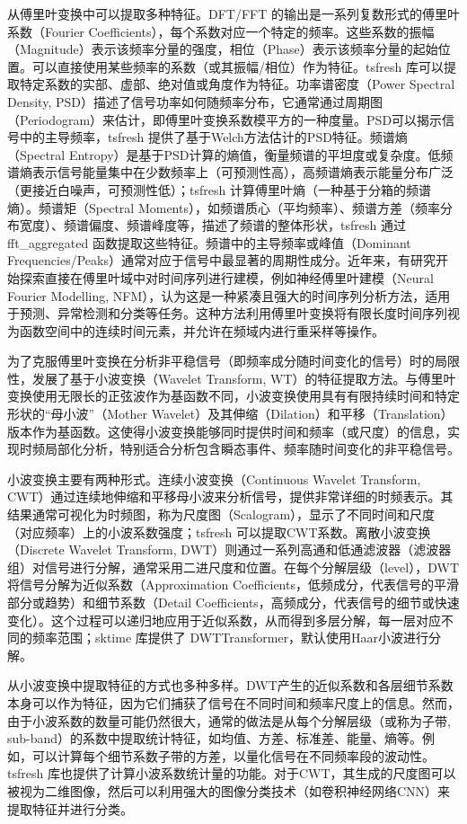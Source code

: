 从傅里叶变换中可以提取多种特征。DFT/FFT 的输出是一系列复数形式的傅里叶系数（Fourier Coefficients），每个系数对应一个特定的频率。这些系数的振幅（Magnitude）表示该频率分量的强度，相位（Phase）表示该频率分量的起始位置。可以直接使用某些频率的系数（或其振幅/相位）作为特征。tsfresh 库可以提取特定系数的实部、虚部、绝对值或角度作为特征。功率谱密度（Power Spectral Density, PSD）描述了信号功率如何随频率分布，它通常通过周期图（Periodogram）来估计，即傅里叶变换系数模平方的一种度量。PSD可以揭示信号中的主导频率，tsfresh 提供了基于Welch方法估计的PSD特征。频谱熵（Spectral Entropy）是基于PSD计算的熵值，衡量频谱的平坦度或复杂度。低频谱熵表示信号能量集中在少数频率上（可预测性高），高频谱熵表示能量分布广泛（更接近白噪声，可预测性低）；tsfresh 计算傅里叶熵（一种基于分箱的频谱熵）。频谱矩（Spectral Moments），如频谱质心（平均频率）、频谱方差（频率分布宽度）、频谱偏度、频谱峰度等，描述了频谱的整体形状，tsfresh 通过 fft\_aggregated 函数提取这些特征。频谱中的主导频率或峰值（Dominant Frequencies/Peaks）通常对应于信号中最显著的周期性成分。近年来，有研究开始探索直接在傅里叶域中对时间序列进行建模，例如神经傅里叶建模（Neural Fourier Modelling, NFM），认为这是一种紧凑且强大的时间序列分析方法，适用于预测、异常检测和分类等任务。这种方法利用傅里叶变换将有限长度时间序列视为函数空间中的连续时间元素，并允许在频域内进行重采样等操作。

为了克服傅里叶变换在分析非平稳信号（即频率成分随时间变化的信号）时的局限性，发展了基于小波变换（Wavelet Transform, WT）的特征提取方法。与傅里叶变换使用无限长的正弦波作为基函数不同，小波变换使用具有有限持续时间和特定形状的“母小波”（Mother Wavelet）及其伸缩（Dilation）和平移（Translation）版本作为基函数。这使得小波变换能够同时提供时间和频率（或尺度）的信息，实现时频局部化分析，特别适合分析包含瞬态事件、频率随时间变化的非平稳信号。

小波变换主要有两种形式。连续小波变换（Continuous Wavelet Transform, CWT）通过连续地伸缩和平移母小波来分析信号，提供非常详细的时频表示。其结果通常可视化为时频图，称为尺度图（Scalogram），显示了不同时间和尺度（对应频率）上的小波系数强度；tsfresh 可以提取CWT系数。离散小波变换（Discrete Wavelet Transform, DWT）则通过一系列高通和低通滤波器（滤波器组）对信号进行分解，通常采用二进尺度和位置。在每个分解层级（level），DWT将信号分解为近似系数（Approximation Coefficients，低频成分，代表信号的平滑部分或趋势）和细节系数（Detail Coefficients，高频成分，代表信号的细节或快速变化）。这个过程可以递归地应用于近似系数，从而得到多层分解，每一层对应不同的频率范围；sktime 库提供了 DWTTransformer，默认使用Haar小波进行分解。

从小波变换中提取特征的方式也多种多样。DWT产生的近似系数和各层细节系数本身可以作为特征，因为它们捕获了信号在不同时间和频率尺度上的信息。然而，由于小波系数的数量可能仍然很大，通常的做法是从每个分解层级（或称为子带, sub-band）的系数中提取统计特征，如均值、方差、标准差、能量、熵等。例如，可以计算每个细节系数子带的方差，以量化信号在不同频率段的波动性。tsfresh 库也提供了计算小波系数统计量的功能。对于CWT，其生成的尺度图可以被视为二维图像，然后可以利用强大的图像分类技术（如卷积神经网络CNN）来提取特征并进行分类。

